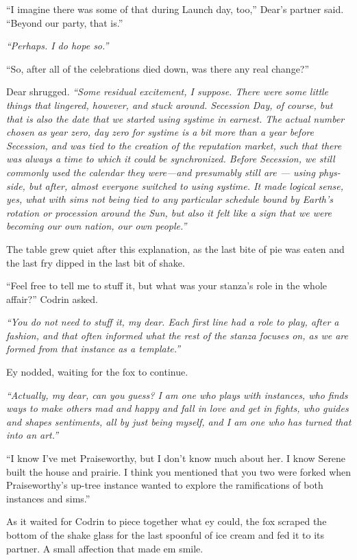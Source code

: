 ``I imagine there was some of that during Launch day, too,'' Dear's partner said. ``Beyond our party, that is.''

\emph{``Perhaps. I do hope so.''}

``So, after all of the celebrations died down, was there any real change?''

Dear shrugged. \emph{``Some residual excitement, I suppose. There were some little things that lingered, however, and stuck around. Secession Day, of course, but that is also the date that we started using systime in earnest. The actual number chosen as year zero, day zero for systime is a bit more than a year before Secession, and was tied to the creation of the reputation market, such that there was always a time to which it could be synchronized. Before Secession, we still commonly used the calendar they were---and presumably still are — using phys-side, but after, almost everyone switched to using systime. It made logical sense, yes, what with sims not being tied to any particular schedule bound by Earth's rotation or procession around the Sun, but also it felt like a sign that we were becoming our own nation, our own people.''}

The table grew quiet after this explanation, as the last bite of pie was eaten and the last fry dipped in the last bit of shake.

``Feel free to tell me to stuff it, but what was your stanza's role in the whole affair?'' Codrin asked.

\emph{``You do not need to stuff it, my dear. Each first line had a role to play, after a fashion, and that often informed what the rest of the stanza focuses on, as we are formed from that instance as a template.''}

Ey nodded, waiting for the fox to continue.

\emph{``Actually, my dear, can you guess? I am one who plays with instances, who finds ways to make others mad and happy and fall in love and get in fights, who guides and shapes sentiments, all by just being myself, and I am one who has turned that into an art.''}

``I know I've met Praiseworthy, but I don't know much about her. I know Serene built the house and prairie. I think you mentioned that you two were forked when Praiseworthy's up-tree instance wanted to explore the ramifications of both instances and sims.''

As it waited for Codrin to piece together what ey could, the fox scraped the bottom of the shake glass for the last spoonful of ice cream and fed it to its partner. A small affection that made em smile.

